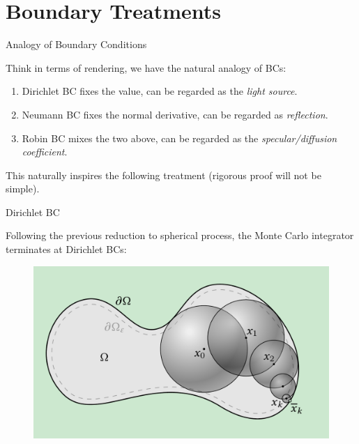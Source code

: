 \documentclass{beamer}
\begin{document}

\section{Boundary Treatments}

\begin{frame}{Analogy of Boundary Conditions}

	Think in terms of rendering, we have the natural analogy of BCs:
	\begin{enumerate}
		\item Dirichlet BC fixes the value, can be regarded as the \emph{light source}.
		\item Neumann BC fixes the normal derivative, can be regarded as \emph{reflection}.
		\item Robin BC mixes the two above, can be regarded as the \emph{specular/diffusion coefficient}.
	\end{enumerate}

	This naturally inspires the following treatment (rigorous proof will not be simple).

\end{frame}

\begin{frame}{Dirichlet BC}

	Following the previous reduction to spherical process, the Monte Carlo integrator terminates at Dirichlet BCs:
	
	\begin{figure}[htbp]
		\centering
		\includegraphics[scale=0.3]{img/DBC.png}
	\end{figure}


\end{frame}
\end{document}
